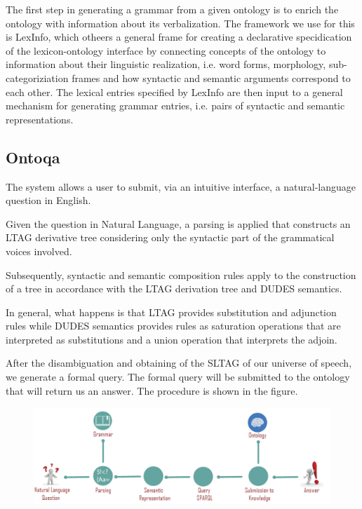 The first step in generating a grammar from a given ontology is to enrich the ontology with information about its verbalization. The framework we use for this is LexInfo, which otheers a general frame for creating a declarative specidication of the lexicon-ontology interface by connecting concepts of the ontology to information about their linguistic realization, i.e. word forms, morphology, sub-categoriziation frames and how syntactic and semantic arguments correspond to each other. The lexical entries specified by LexInfo are then input to a general mechanism for generating grammar entries, i.e. pairs of syntactic and semantic
representations.

\subsection{Ontoqa}
The system allows a user to submit, via an intuitive interface, a natural-language question in English.

Given the question in Natural Language, a parsing is applied that constructs an LTAG derivative tree considering only the syntactic part of the grammatical voices involved.

Subsequently, syntactic and semantic composition rules apply to the construction of a tree in accordance with the LTAG derivation tree and DUDES semantics.

In general, what happens is that LTAG provides substitution and adjunction rules while DUDES semantics provides rules as saturation operations that are interpreted as substitutions and a union operation that interprets the adjoin.

After the disambiguation and obtaining of the SLTAG of our universe of speech, we generate a formal query. The formal query will be submitted to the ontology that will return us an answer. The procedure is shown in the figure.

\begin{figure}[H]
   \centering
    \includegraphics[scale=0.5]{./fig/ontoqa}
     \caption{}
    \label{fig: ontoqa}
\end{figure}